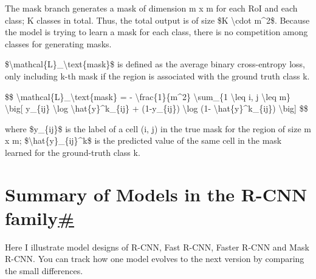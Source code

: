 The mask branch generates a mask of dimension m x m for each RoI and each class; K classes in total. Thus, the total output is of size \$K \textbackslash cdot m\^{}2\$. Because the model is trying to learn a mask for each class, there is no competition among classes for generating masks.

\$\textbackslash mathcal\{L\}\_\textbackslash text\{mask\}\$ is defined as the average binary cross-entropy loss, only including k-th mask if the region is associated with the ground truth class k.

\$\$ \textbackslash mathcal\{L\}\_\textbackslash text\{mask\} = - \textbackslash frac\{1\}\{m\^{}2\} \textbackslash sum\_\{1 \textbackslash leq i, j \textbackslash leq m\} \textbackslash big{[} y\_\{ij\} \textbackslash log \textbackslash hat\{y\}\^{}k\_\{ij\} + (1-y\_\{ij\}) \textbackslash log (1- \textbackslash hat\{y\}\^{}k\_\{ij\}) \textbackslash big{]} \$\$

where \$y\_\{ij\}\$ is the label of a cell (i, j) in the true mask for the region of size m x m; \$\textbackslash hat\{y\}\_\{ij\}\^{}k\$ is the predicted value of the same cell in the mask learned for the ground-truth class k.

\section{\texorpdfstring{Summary of Models in the R-CNN family\hyperref[summary-of-models-in-the-r-cnn-family]{\#}}{Summary of Models in the R-CNN family\#}}\label{summary-of-models-in-the-r-cnn-family}

Here I illustrate model designs of R-CNN, Fast R-CNN, Faster R-CNN and Mask R-CNN. You can track how one model evolves to the next version by comparing the small differences.


